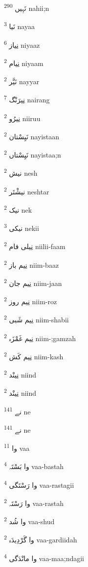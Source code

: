 \documentclass[12pt]{article}
\begin{document}
\begin{RTL}
\begin{multicols}{5}
{\ur نَہِیں}   \textsuperscript{290} nahii;n

{\ur نَیا}   \textsuperscript{3} nayaa

{\ur نِیاز}   \textsuperscript{6} niyaaz

{\ur نِیام}   \textsuperscript{2} niyaam

{\ur نَیَّر}   \textsuperscript{2} nayyar

{\ur نِیرَنْگ}   \textsuperscript{7} nairang

{\ur نِیرُو}   \textsuperscript{2} niiruu

{\ur نَیِسْتان}   \textsuperscript{2} nayistaan

{\ur نَیِسْتاں}   \textsuperscript{2} nayistaa;n

{\ur نیش}   \textsuperscript{2} nesh

{\ur نیشْتَر}   \textsuperscript{2} neshtar

{\ur نیک}   \textsuperscript{2} nek

{\ur نیکی}   \textsuperscript{3} nekii

{\ur نِیلی فام}   \textsuperscript{2} niilii-faam

{\ur نِیم باز}   \textsuperscript{2} niim-baaz

{\ur نِیم جان}   \textsuperscript{2} niim-jaan

{\ur نِیم روز}   \textsuperscript{2} niim-roz

{\ur نِیم شَبی}   \textsuperscript{2} niim-shabii

{\ur نِیم غَمْزَہ}   \textsuperscript{2} niim-;gamzah

{\ur نِیم کَش}   \textsuperscript{2} niim-kash

{\ur نِینْد}   \textsuperscript{2} niind

{\ur نِینْد}   \textsuperscript{2} niind

{\ur نے}   \textsuperscript{141} ne

{\ur نے}   \textsuperscript{141} ne

{\ur وا}   \textsuperscript{11} vaa

{\ur وا بَسْتَہ}   \textsuperscript{4} vaa-bastah

{\ur وا رَسْتَگی}   \textsuperscript{4} vaa-rastagii

{\ur وا رَسْتَہ}   \textsuperscript{2} vaa-rastah

{\ur وا شُد}   \textsuperscript{2} vaa-shud

{\ur وا گَرْدِیدَہ}   \textsuperscript{2} vaa-gardiidah

{\ur وا مانْدَگی}   \textsuperscript{4} vaa-maa;ndagii


\end{multicols}
\end{RTL}
\end{document}
